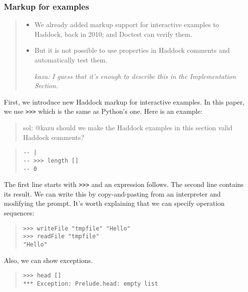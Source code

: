 \documentclass[preprint]{sigplanconf}
\begin{document}
\subsubsection{Markup for examples}

\begin{quote}
\begin{itemize}
    \item
        We already added markup support for interactive examples to
        Haddock, back in 2010; and Doctest can verify them.
    \item
        But it is not possible to use properties in Haddock comments
        and automatically test them.

    \emph{kazu: I guess that it's enough to describe this in the Implementation Section.}
\end{itemize}
\end{quote}

\noindent First, we introduce new Haddock markup for interactive examples.
In this paper, we use {\tt >>>} which is the same as Python's one.
Here is an example:


\begin{quote}
    sol: @kazu should we make the Haddock examples in this section
    valid Haddock comments?
\end{quote}

\begin{quote}
\small
\begin{verbatim}
-- |
-- >>> length []
-- 0
\end{verbatim}
\end{quote}

\noindent The first line starts with {\tt >>>} and an expression follows. The second line contains its result. We can write this by copy-and-pasting from an interpreter and modifying the prompt.
It's worth explaining that we can specify operation sequences:

\begin{quote}
\small
\begin{verbatim}
>>> writeFile "tmpfile" "Hello"
>>> readFile "tmpfile"
"Hello"
\end{verbatim}
\end{quote}

\noindent Also, we can show exceptions.

\begin{quote}
\small
\begin{verbatim}
>>> head []
*** Exception: Prelude.head: empty list
\end{verbatim}
\end{quote}
\end{document}
